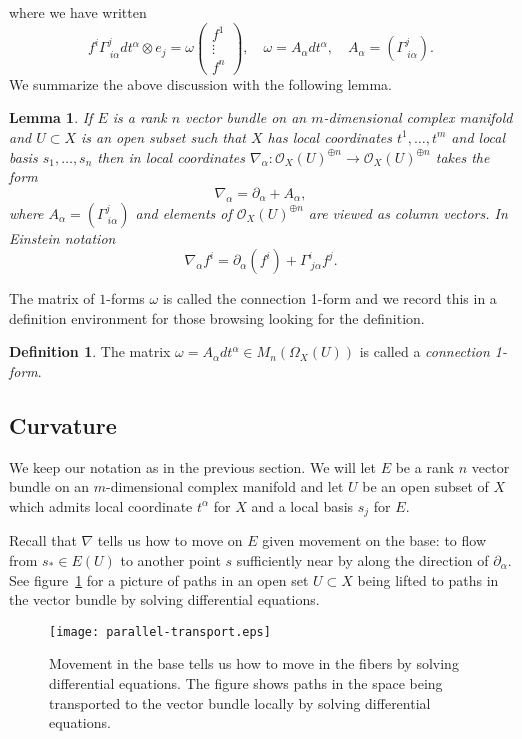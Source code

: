 \documentclass[12pt]{book}
\numberwithin{equation}{section}
\newtheorem{lemma}[theorem]{Lemma}
\theoremstyle{definition}
\newtheorem{definition}[theorem]{Definition}
\theoremstyle{remark}
\newcommand{\Ocal}{\mathcal{O}}
\begin{document}
where we have written
$$ f^i \Gamma^j_{\ i \alpha} dt^{\alpha} \otimes e_j= \omega \begin{pmatrix}
f^1 \\
\vdots \\
f^n
\end{pmatrix}, \quad \omega = A_{\alpha} dt^{\alpha}, \quad A_{\alpha} = (\Gamma^j_{\ i \alpha}).$$
We summarize the above discussion with the following lemma.
\begin{lemma}
	If $E$ is a rank $n$ vector bundle on an $m$-dimensional complex manifold and $U \subset X$ is an open subset such that $X$ has local coordinates $t^1,\ldots,t^m$ and local basis $s_1,\ldots,s_n$ then in local coordinates  $\nabla_{\alpha}:\Ocal_X(U)^{\oplus n} \to \Ocal_X(U)^{\oplus n}$ takes the form
	$$ \nabla_{\alpha} = \partial_{\alpha} + A_{\alpha},$$
	where $A_{\alpha} = (\Gamma^j_{\ i \alpha})$ and elements of $\Ocal_X(U)^{\oplus n}$ are viewed as column vectors.
	In Einstein notation
	$$ \nabla_{\alpha} f^i = \partial_{\alpha}(f^i) + \Gamma^i_{\ j \alpha}f^j.$$
\end{lemma}

The matrix of $1$-forms $\omega$ is called the connection 1-form and we record this in a definition environment for those browsing looking for the definition.
\begin{definition}
	The matrix $\omega = A_{\alpha}dt^{\alpha} \in M_n(\Omega_X(U))$ is called a \emph{connection 1-form}.
\end{definition}


\subsection{Curvature}
We keep our notation as in the previous section.
We will let $E$ be a rank $n$ vector bundle on an $m$-dimensional complex manifold and let $U$ be an open subset of $X$ which admits local coordinate $t^{\alpha}$ for $X$ and a local basis $s_j$ for $E$.

Recall that $\nabla$ tells us how to move on $E$ given movement on the base: to flow from $s_* \in E(U)$ to another point $s$ sufficiently near by along the direction of $\partial_{\alpha}$. 
See figure~\ref{F:parallel-transport} for a picture of paths in an open set $U\subset X$ being lifted to paths in the vector bundle by solving differential equations.
\begin{figure}[h]\label{F:parallel-transport}
	\begin{center}
		\texttt{[image: parallel-transport.eps]}
	\end{center}
	\caption{Movement in the base tells us how to move in the fibers by solving differential equations. The figure shows paths in the space being transported to the vector bundle locally by solving differential equations.}
\end{figure}
\end{document}
